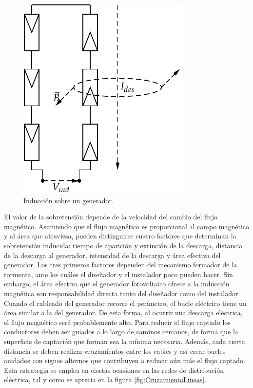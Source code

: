 %
\begin{figure}
\begin{centering}
\includegraphics{../figs/SobretensionInducida}
\end{centering}

\caption{\label{fig:InduccionGenerador}Inducción sobre un generador.}

\end{figure}


El valor de la sobretensión depende de la velocidad del cambio del
flujo magnético. Asumiendo que el flujo magnético es proporcional
al campo magnético y al área que atraviesa, pueden distinguirse cuatro
factores que determinan la sobretensión inducida: tiempo de aparición
y extinción de la descarga, distancia de la descarga al generador,
intensidad de la descarga y área efectiva del generador. Los tres
primeros factores dependen del mecanismo formador de la tormenta,
ante los cuáles el diseñador y el instalador poco pueden hacer. Sin
embargo, el área efectiva que el generador fotovoltaico ofrece a la
inducción magnética son responsabilidad directa tanto del diseñador
como del instalador. Cuando el cableado del generador recorre el perímetro,
el bucle eléctrico tiene un área similar a la del generador. De esta
forma, al ocurrir una descarga eléctrica, el flujo magnético será
probablemente alto. Para reducir el flujo captado los conductores
deben ser guiados a lo largo de caminos cercanos, de forma que la
superficie de captación que forman sea la mínima necesaria. Además,
cada cierta distancia se deben realizar cruzamientos entre los cables
y así crear bucles anidados con signos alternos que contribuyen a
reducir aún más el flujo captado. Esta estrategia se emplea en ciertas
ocasiones en las redes de distribución eléctrica, tal y como se aprecia
en la figura \ref{fig:CruzamientoLineas}.

